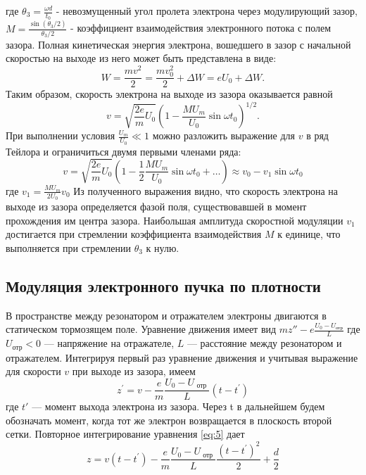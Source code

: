 где $\theta _ { 3 } = \frac { \omega d } { t _ { 0 } }$ - невозмущенный угол пролета электрона через модулирующий зазор, $M = \frac { \sin \left( \theta _ { 3 } / 2 \right) } { \theta _ { 3 } / 2 }$ - коэффициент взаимодействия электронного потока с полем зазора. Полная кинетическая энергия электрона, вошедшего в зазор с начальной скоростью на выходе из него может быть представлена в виде:
\begin{equation}
	W = \frac { m v ^ { 2 } } { 2 } = \frac { m v_0 ^ { 2 } } { 2 } + \Delta W = e U _ { 0 } + \Delta W.
	\label{eq:2}
\end{equation}
Таким образом, скорость электрона на выходе из зазора оказывается равной
\begin{equation}
	v = \sqrt { \frac { 2 e } { m } U _ { 0 } } \left( 1 - \frac { M U _ { m } } { U _ { 0 } } \sin \omega t _ { 0 } \right) ^ { 1 / 2 }.
	\label{eq:3}
\end{equation}
При выполнении условия $\frac { U _ { m } } { U _ { 0 } } \ll 1$ можно разложить выражение для $v$ в ряд Тейлора и ограничиться двумя первыми членами ряда:
\begin{equation}
	v = \sqrt { \frac { 2 e } { m } U _ { 0 } } \left( 1 - \frac { 1 } { 2 } \frac { M U _ { m } } { U _ { 0 } } \sin \omega t _ { 0 } + \ldots \right) \approx v _ { 0 } - v _ { 1 } \sin \omega t _ { 0 }
	\label{eq:4}
\end{equation} где $v _ { 1 } = \frac { M U _ { m } } { 2 U _ { 0 } } v _ { 0 }$
Из полученного выражения видно, что скорость электро­на на выходе из зазора определяется фазой поля, существовавшей в момент прохождения им центра зазора. Наибольшая амплитуда скоростной модуляции $v_1$ достигается при стремлении коэффициента взаимодействия $M$ к единице, что выполняется при стремлении $\theta_3$ к нулю.

\subsection{Модуляция электронного пучка по плотности}

В пространстве между резонатором и отражателем электроны двигаются в статическом тормозящем поле. Уравнение движения имеет вид 
$mz''- e \frac { U _ { 0 } - U _ { \text{отр} } } { L }$ где $U_{\text{отр}} < 0$ — напряжение на отражателе, $L$ — расстояние между резонатором и отражателем. Интегрируя первый раз уравнение движения и учитывая выражение для скорости $v$ при выходе из зазора, имеем
\begin{equation}
	z ^ { \prime } = v - \frac { e } { m } \frac { U _ { 0 } - U _ { \text { отр } } } { L } \left( t - t ^ { \prime } \right)
	\label{eq:5}
\end{equation}
где $t'$ — момент выхода электрона из зазора. Через t в дальнейшем будем обозначать момент, когда тот же электрон возвращается в плоскость второй сетки. Повторное интегрирование уравнения \eqref{eq:5} дает
\begin{equation}
	z = v \left( t - t ^ { \prime } \right) - \frac { e } { m } \frac { U _ { 0 } - U _ { \text { отр } } } { L } \frac { \left( t - t ^ { \prime } \right) ^ { 2 } } { 2 } + \frac { d } { 2 }
	\label{eq:6}
\end{equation}

